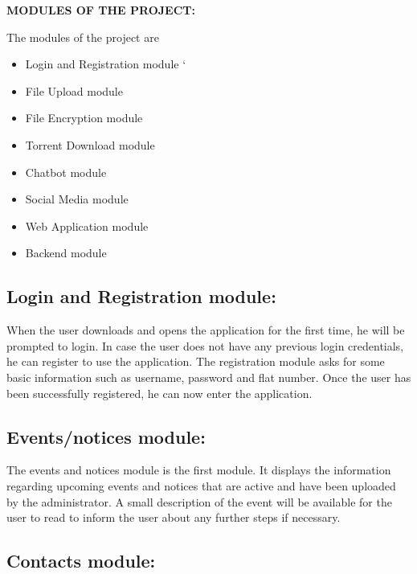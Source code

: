 \textbf{MODULES OF THE PROJECT:}

The modules of the project are
\begin{itemize}

\item	Login and Registration module
`
\item	File Upload module

\item   File Encryption module

\item   Torrent Download module

\item	Chatbot module

\item	Social Media module

\item	Web Application module

\item   Backend module
\end{itemize}



\subsection{Login and Registration module:}

When the user downloads and opens the application for the first time, he will be prompted to login. In case the user does not have any previous login credentials, he can register to use the application. The registration module asks for some basic information such as username, password and flat number. Once the user has been successfully registered, he can now enter the application.

\subsection{Events/notices module:}

The events and notices module is the first module. It displays the information regarding upcoming events and notices that are active and have been uploaded by the administrator. A small description of the event will be available for the user to read to inform the user about any further steps if necessary.

\subsection{Contacts module:}


